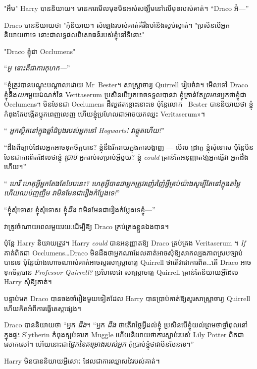 {{{{{{{"អឹម" Harry បាននិយាយ។ មាន​ការ​មើល​មុខ​មិន​អស់​សង្ឃឹម​នៅ​លើ​មុខ​របស់​គាត់។ “Draco អ៊ំ—”

Draco បាននិយាយថា "កុំនិយាយ។ សំឡេងរបស់គាត់គឺរឹងមាំនិងស្ងប់ស្ងាត់។ "ប្រសិនបើអ្នកនិយាយថាទេ នោះជាលទ្ធផលពិសោធន៍របស់ខ្ញុំនៅទីនោះ"

"Draco ខ្ញុំជា Occlumens"

“\emph{អូ នោះគឺជាការកុហក—}”

“ខ្ញុំត្រូវបានបណ្តុះបណ្តាលដោយ Mr~Bester។ សាស្រ្តាចារ្យ Quirrell រៀបចំវា។ មើលទៅ Draco ខ្ញុំនឹង\emph{យក}មួយដំណក់នៃ Veritaserum ប្រសិនបើអ្នកអាចទទួលបានវា ខ្ញុំគ្រាន់តែ\emph{ព្រមាន}អ្នកថាខ្ញុំជា Occlumens។ មិន​មែន​ជា Occlumens ដ៏​ល្អ​ឥត​ខ្ចោះ​នោះ​ទេ ប៉ុន្តែ​លោក ~Bester បាន​និយាយ​ថា ខ្ញុំ​កំពុង​តែ​បង្កើត​ប្លុក​ពេញលេញ ហើយ​ខ្ញុំ​ប្រហែល​ជា​អាច​យក​ឈ្នះ Veritaserum»។

“\emph{ អ្នកស្ថិតនៅក្នុងឆ្នាំដំបូងរបស់អ្នកនៅ Hogwarts! វាឆ្កួតហើយ!}”

“ដឹងពីច្បាប់ដែលអ្នកអាចទុកចិត្តបាន? ខ្ញុំ​នឹង​រីករាយ​ក្នុង​ការ​បង្ហាញ — មើល ដ្រាកូ ខ្ញុំ​សុំទោស ប៉ុន្តែ​មិន​មែន​ជា​ការ​ពិត​ដែល​ថា​ខ្ញុំ \emph{ប្រាប់​} អ្នក​រាប់​សម្រាប់​អ្វី​មួយ? ខ្ញុំ \emph{could} គ្រាន់តែអនុញ្ញាតឱ្យអ្នកធ្វើវា អ្នកដឹងហើយ។”

“\emph{ ហេរី ហេតុអ្វីអ្នកតែងតែបែបនេះ? ហេតុអ្វី​បាន​ជា​អ្នក​ត្រូវ​រញ៉េរញ៉ៃ​អ្វី​គ្រប់​យ៉ាង​សូម្បី​តែ​នៅ​ក្នុង​តម្លៃ  ហើយ​ឈប់​ញញឹម វា​មិន​មែន​ជា​រឿង​កំប្លែង​ទេ!}”

“ខ្ញុំសុំទោស ខ្ញុំសុំទោស ខ្ញុំ\emph{ដឹង} វាមិនមែនជារឿងកំប្លែងទេខ្ញុំ—”

វាត្រូវចំណាយពេលមួយរយៈដើម្បីឱ្យ Draco គ្រប់គ្រងខ្លួនឯងបាន។

ប៉ុន្តែ Harry និយាយត្រូវ។ Harry \emph{could} បានអនុញ្ញាតឱ្យ Draco គ្រប់គ្រង Veritaserum ។ \emph{If} គាត់ពិតជា Occlumens…Draco មិនដឹងថាអ្នកណាដែលគាត់អាចសុំឱ្យសាកល្បងភាពស្របច្បាប់បានទេ ប៉ុន្តែយ៉ាងហោចណាស់គាត់អាចសួរសាស្រ្តាចារ្យ Quirrell ថាតើវាជាការពិត…តើ Draco អាចទុកចិត្តបាន \emph{Professor Quirrell?} ប្រហែលជា សាស្ត្រាចារ្យ Quirrell គ្រាន់តែនិយាយអ្វីដែល Harry សុំឱ្យគាត់។

បន្ទាប់មក Draco បានចងចាំរឿងមួយទៀតដែល Harry បានប្រាប់គាត់ឱ្យសួរសាស្រ្តាចារ្យ Quirrell ហើយគិតអំពីការធ្វើតេស្តផ្សេង។

Draco បាននិយាយថា “អ្នក \emph{ដឹង}។ “អ្នក \emph{ដឹង} ថាតើវាថ្លៃអ្វីដល់ខ្ញុំ ប្រសិនបើខ្ញុំយល់ព្រមថាថ្នាំពុលនៅក្នុងផ្ទះ Slytherin កំពុងស្អប់ទារក Muggle ហើយនិយាយថាការស្លាប់របស់ Lily Potter ពិតជាសោកសៅ។ ហើយនោះជា\emph{ផ្នែកនៃគម្រោងរបស់អ្នក} កុំប្រាប់ខ្ញុំថាវាមិនមែនទេ។”

Harry មិន​បាន​និយាយ​អ្វី​សោះ ដែល​ជា​ការ​ឈ្លាសវៃ​របស់​គាត់។

}}}}}}}
